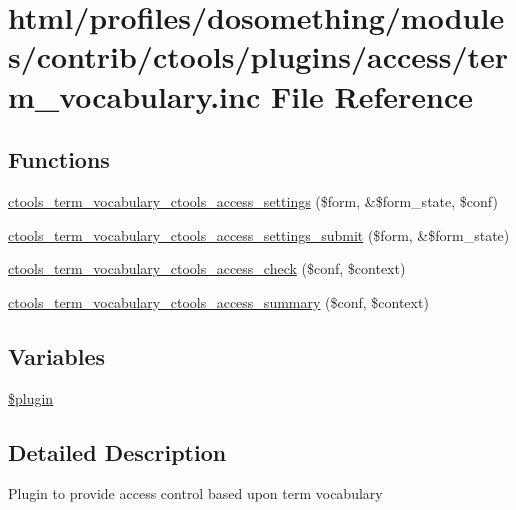 \hypertarget{term__vocabulary_8inc}{
\section{html/profiles/dosomething/modules/contrib/ctools/plugins/access/term\_\-vocabulary.inc File Reference}
\label{term__vocabulary_8inc}
}
\subsection*{Functions}
\begin{DoxyCompactItemize}
\item 
\hyperlink{term__vocabulary_8inc_ae18553827837c60ede1ad1de67a7db0f}{ctools\_\-term\_\-vocabulary\_\-ctools\_\-access\_\-settings} (\$form, \&\$form\_\-state, \$conf)
\item 
\hyperlink{term__vocabulary_8inc_a1787965aae591062c63fa62fca5ef1c6}{ctools\_\-term\_\-vocabulary\_\-ctools\_\-access\_\-settings\_\-submit} (\$form, \&\$form\_\-state)
\item 
\hyperlink{term__vocabulary_8inc_a79be668438a339931a3a446a3138b464}{ctools\_\-term\_\-vocabulary\_\-ctools\_\-access\_\-check} (\$conf, \$context)
\item 
\hyperlink{term__vocabulary_8inc_a4801f982fa0a1684d9d339851a63dc62}{ctools\_\-term\_\-vocabulary\_\-ctools\_\-access\_\-summary} (\$conf, \$context)
\end{DoxyCompactItemize}
\subsection*{Variables}
\begin{DoxyCompactItemize}
\item 
\hyperlink{term__vocabulary_8inc_ada8a7130088351710bb02ed622d6bf65}{\$plugin}
\end{DoxyCompactItemize}


\subsection{Detailed Description}
Plugin to provide access control based upon term vocabulary 

